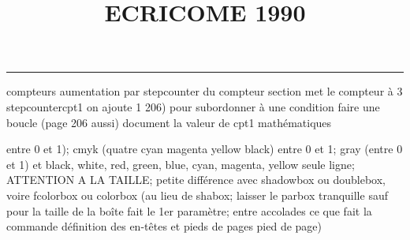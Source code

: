 \documentclass[11pt]{article}%
\title{\bf \vspace{-2cm} ECRICOME 1990} %
\author{} %
\date{} %
\renewcommand{\headrulewidth}{0pt}%
\renewcommand{\footrulewidth}{0.4pt}%
\begin{document}
\maketitle %
\vspace{-1.4cm}\hrule %
\thispagestyle{fancy}

\vspace*{.2cm}



compteurs%
aumentation par stepcounter du compteur section%
met le compteur à 3%
stepcounter{cpt1} on ajoute 1%
206) pour subordonner à une condition %
faire une boucle (page 206 aussi) %
document la valeur de cpt1 
mathématiques\newcommand{\ch}{\operatorname{ch}} 
\newcommand{\sh}{\operatorname{sh}}
\renewcommand{\tanh}{\operatorname{th}}
\renewcommand{\sinh}{\operatorname{sh}}
\renewcommand{\cosh}{\operatorname{ch}}
\newcommand{\argsh}{\operatorname{argsh}}
\newcommand{\argch}{\operatorname{argch}}
\newcommand{\argth}{\operatorname{argth}}
\newcommand{\Id}{\operatorname{Id}}
\renewcommand{\leq}{\leq}
\renewcommand{\geq}{\geq }

\newcommand{\dlim}{\lim}
\newcommand{\dsum}{\sum}
\newcommand{\dint}{\int}
\newcommand{\dprod}{\prod}



entre 0 et 1); cmyk (quatre cyan magenta yellow black) entre 0 et 1;
gray (entre 0 et 1) et black, white, red, green, blue, cyan, magenta,
yellow%
seule ligne; ATTENTION A LA TAILLE; petite différence avec shadowbox ou
doublebox, voire fcolorbox ou colorbox (au lieu de shabox; laisser le
parbox tranquille sauf pour la taille de la boîte
\newcommand{\Tbox}[1]{\begin{center} \shabox{\parbox{0.6
\linewidth}{#1}} \end{center}} %
fait le 1er paramètre; entre accolades ce que fait la commande
définition des en-têtes et pieds de pages\pagestyle{fancy}
\chead{}
\rfoot[ \ \thepage]{\thepage}
\cfoot{}
\lfoot{}
\thispagestyle{fancy} %
pied de page)\renewcommand{\footrulewidth}{0.4pt}
\renewcommand{\headrulewidth}{0.4pt}
\end{document}
